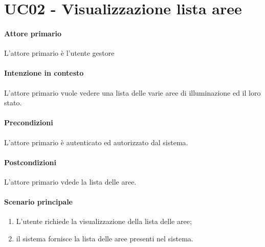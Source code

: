 \section{UC02 - Visualizzazione lista aree}

\paragraph{Attore primario} L'attore primario è l'utente gestore
\paragraph{Intenzione in contesto} L'attore primario vuole vedere una lista delle varie aree di illuminazione ed il loro stato.

\paragraph{Precondizioni} L'attore primario è autenticato ed autorizzato dal sistema.

\paragraph{Postcondizioni} L'attore primario vdede la lista delle aree.

\paragraph{Scenario principale}

\begin{enumerate}
    \item L'utente richiede la visualizzazione della lista delle aree;
    \item il sistema fornisce la lista delle aree presenti nel sistema.
\end{enumerate}
